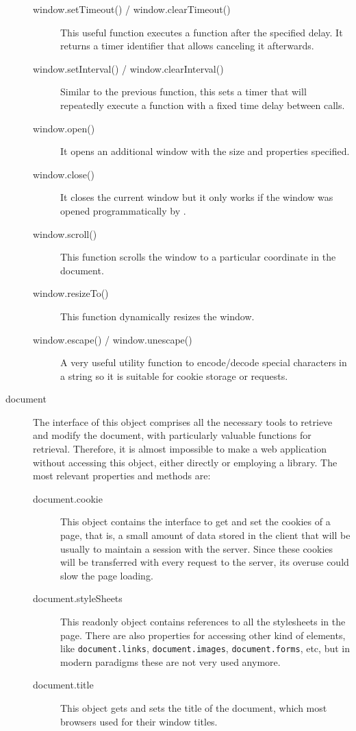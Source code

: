 \begin{description}
\begin{description}
    \item[window.setTimeout() / window.clearTimeout()] This useful function executes a function after the specified delay.
    It returns a timer identifier that allows canceling it afterwards.
    \item[window.setInterval() / window.clearInterval()] Similar to the previous function, this sets a timer that will repeatedly execute a function with a fixed time delay between calls.
    \item[window.open()] It opens an additional window with the size and properties specified.
    \item[window.close()] It closes the current window but it only works if the window was opened programmatically by .
    \item[window.scroll()] This function scrolls the window to a particular coordinate in the document.
    \item[window.resizeTo()] This function dynamically resizes the window.
    \item[window.escape() / window.unescape()] A very useful utility function to encode/decode special characters in a string so it is suitable for cookie storage or  requests.
  \end{description}
  \item[document] The interface of this object comprises all the necessary tools to retrieve and modify the document, with particularly valuable functions for  retrieval.
  Therefore, it is almost impossible to make a web application without accessing this object, either directly or employing a  library.
  The most relevant properties and methods are:
  \begin{description}
    \item[document.cookie] This object contains the interface to get and set the cookies of a page, that is, a small amount of data stored in the client that will be usually to maintain a session with the server.
    Since these cookies will be transferred with every request to the server, its overuse could slow the page loading.
    \item[document.styleSheets] This readonly object contains references to all the stylesheets in the page.
    There are also properties for accessing other kind of elements, like \texttt{document.links}, \texttt{document.images}, \texttt{document.forms}, etc, but in modern  paradigms these are not very used anymore.
    \item[document.title] This object gets and sets the title of the document, which most browsers used for their window titles.

\end{description}
\end{description}
